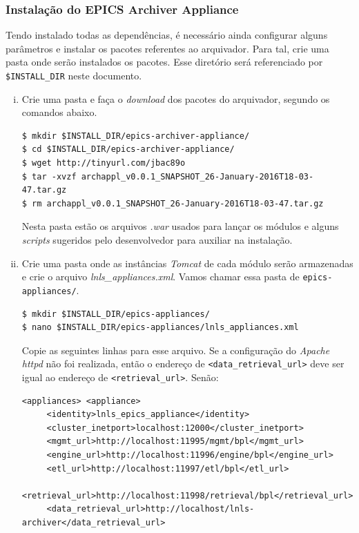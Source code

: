 \subsubsection {Instalação do EPICS Archiver Appliance}
\label{sec:epicsappl}

Tendo instalado todas as dependências, é necessário ainda configurar
alguns parâmetros e instalar os pacotes referentes ao arquivador. Para tal, crie
uma pasta onde serão instalados os pacotes. Esse diretório será referenciado por
\texttt{\$INSTALL\_DIR} neste documento.

\begin {enumerate}[i.] 
  \item Crie uma pasta e faça o \textit{download} dos pacotes do arquivador,
  segundo os comandos abaixo. 
\begin{lstlisting}[keywordstyle=\ttfamily, style=nonumbers]
$ mkdir $INSTALL_DIR/epics-archiver-appliance/
$ cd $INSTALL_DIR/epics-archiver-appliance/
$ wget http://tinyurl.com/jbac89o
$ tar -xvzf archappl_v0.0.1_SNAPSHOT_26-January-2016T18-03-47.tar.gz
$ rm archappl_v0.0.1_SNAPSHOT_26-January-2016T18-03-47.tar.gz
\end{lstlisting}
	Nesta pasta estão os arquivos \textit{.war}  usados para lançar os módulos e
	alguns \textit{scripts} sugeridos pelo desenvolvedor para auxiliar na
	instalação.
  \item \label{item:appl} Crie uma pasta onde as instâncias \textit{Tomcat} de cada módulo serão
  armazenadas e crie o arquivo \textit{lnls\_appliances.xml}. Vamos chamar essa
  pasta de \texttt{epics-appliances/}. 
\begin{lstlisting}[keywordstyle=\ttfamily, style=nonumbers]
$ mkdir $INSTALL_DIR/epics-appliances/
$ nano $INSTALL_DIR/epics-appliances/lnls_appliances.xml
\end{lstlisting}
Copie as seguintes linhas para esse arquivo. Se a configuração do
\textit{Apache httpd} não foi realizada, então o endereço de
\texttt{<data\_retrieval\_url>} deve ser igual ao endereço de
\texttt{<retrieval\_url>}. Senão:
\begin{lstlisting}[keywordstyle=\ttfamily, style=nonumbers]
<appliances> <appliance>
     <identity>lnls_epics_appliance</identity>
     <cluster_inetport>localhost:12000</cluster_inetport>
     <mgmt_url>http://localhost:11995/mgmt/bpl</mgmt_url>
     <engine_url>http://localhost:11996/engine/bpl</engine_url>
     <etl_url>http://localhost:11997/etl/bpl</etl_url>
     <retrieval_url>http://localhost:11998/retrieval/bpl</retrieval_url>
     <data_retrieval_url>http://localhost/lnls-archiver</data_retrieval_url>

\end{lstlisting}
\end{enumerate}
